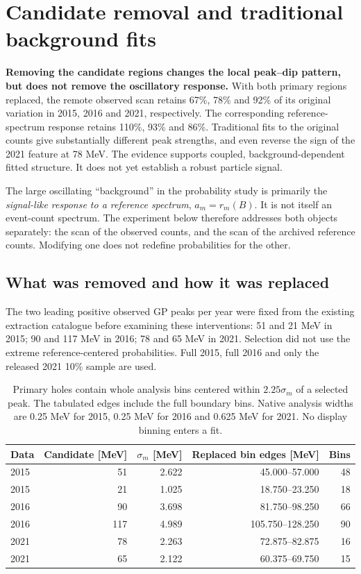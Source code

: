 \section{Candidate removal and traditional background fits}
\label{sec:candidate-removal}
\textbf{Removing the candidate regions changes the local peak--dip pattern, but does not remove the oscillatory response.} With both primary regions replaced, the remote observed scan retains 67\%, 78\% and 92\% of its original variation in 2015, 2016 and 2021, respectively. The corresponding reference-spectrum response retains 110\%, 93\% and 86\%. Traditional fits to the original counts give substantially different peak strengths, and even reverse the sign of the 2021 feature at 78 MeV. The evidence supports coupled, background-dependent fitted structure. It does not yet establish a robust particle signal.

The large oscillating ``background'' in the probability study is primarily the \emph{signal-like response to a reference spectrum}, $a_m=r_m(B)$. It is not itself an event-count spectrum. The experiment below therefore addresses both objects separately: the scan of the observed counts, and the scan of the archived reference counts. Modifying one does not redefine probabilities for the other.

\subsection{What was removed and how it was replaced}
The two leading positive observed GP peaks per year were fixed from the existing extraction catalogue before examining these interventions: 51 and 21 MeV in 2015; 90 and 117 MeV in 2016; 78 and 65 MeV in 2021. Selection did not use the extreme reference-centered probabilities. Full 2015, full 2016 and only the released 2021 10\% sample are used.
\begin{table}[H]
\centering\small
\begin{tabular}{lrrrr}
\toprule
Data & Candidate [MeV] & $\sigma_m$ [MeV] & Replaced bin edges [MeV] & Bins \\
\midrule
2015 & 51 & 2.622 & 45.000--57.000 & 48 \\
2015 & 21 & 1.025 & 18.750--23.250 & 18 \\
2016 & 90 & 3.698 & 81.750--98.250 & 66 \\
2016 & 117 & 4.989 & 105.750--128.250 & 90 \\
2021 & 78 & 2.263 & 72.875--82.875 & 16 \\
2021 & 65 & 2.122 & 60.375--69.750 & 15 \\
\bottomrule
\end{tabular}
\caption{Primary holes contain whole analysis bins centered within $2.25\sigma_m$ of a selected peak. The tabulated edges include the full boundary bins. Native analysis widths are 0.25 MeV for 2015, 0.25 MeV for 2016 and 0.625 MeV for 2021. No display binning enters a fit.}\label{tab:removal-holes}
\end{table}

